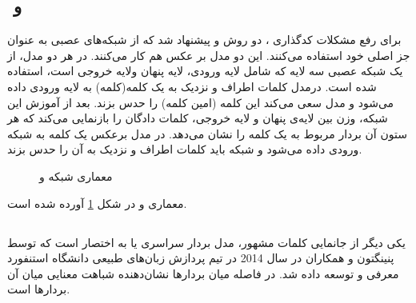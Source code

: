 \subsection{‌ و }
	برای رفع مشکلات کدگذاری 
	، دو روش
	\cite{mikolov2013efficient}
	و
	\cite{mikolov2013efficient}
	پیشنهاد شد که از شبکه‌های عصبی به عنوان جز اصلی خود استفاده می‌کنند. این دو مدل بر عکس هم کار می‌کنند.	در هر دو مدل، از یک شبکه عصبی سه لایه که شامل لایه ورودی، لایه پنهان ولایه خروجی است، استفاده شده است. درمدل 
	کلمات اطراف و نزدیک به یک کلمه(کلمه) به لایه ورودی داده می‌شود و مدل سعی می‌کند این کلمه (امین کلمه) را حدس بزند.  بعد از آموزش این شبکه‌، وزن بین لایه‌ی پنهان و لایه خروجی، کلمات دادگان را بازنمایی می‌کند که هر ستون آن بردار مربوط به یک کلمه را نشان می‌دهد. در مدل
	برعکس 
	یک کلمه به شبکه ورودی داده می‌شود و شبکه باید کلمات اطراف و نزدیک به آن را حدس بزند. 
	\begin{figure}
		\caption[ 
		و
		]{
			معماری شبکه 
			و
			\cite{mikolov2013efficient}	
		}
		\label{fig:CBOW&skip-gram}
	\end{figure}
	معماری 
	و
	در شکل 
	\ref{fig:CBOW&skip-gram}
	آورده شده است. 

\subsection{}
	یکی دیگر از جانمایی کلمات مشهور، مدل بردار سراسری یا به اختصار 
	است که توسط پنینگتون و همکاران 
	\cite{pennington2014glove}
	در سال 2014 در تیم پردازش زبان‌های طبیعی دانشگاه استنفورد معرفی و توسعه داده شد. در 
	فاصله میان بردار‌ها نشان‌دهنده شباهت معنایی میان آن بردارها است.
	
